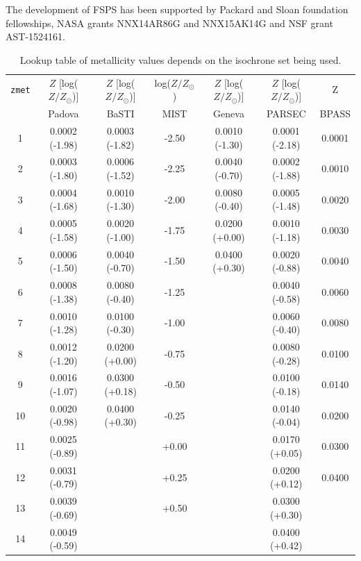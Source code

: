 \documentclass[]{article}
\begin{document}
The development of FSPS has been supported by Packard and Sloan foundation
fellowships, NASA grants NNX14AR86G and NNX15AK14G and NSF grant AST-1524161.


\clearpage

\begin{table}
\begin{center}
\caption{Lookup table of metallicity values depends on the
  isochrone set being used.}
\begin{tabular}{ccccccc}
\hline\hline
\texttt{zmet} & $Z$ [log($Z/Z_\odot$)] &  $Z$ [log($Z/Z_\odot$)] &
log($Z/Z_\odot$) & $Z$ [log($Z/Z_\odot$)] & $Z$ [log($Z/Z_\odot$)] & Z\\ &
Padova & BaSTI & MIST & Geneva & PARSEC & BPASS\\
\hline
1 &  0.0002  (-1.98) &  0.0003  (-1.82) & -2.50 & 0.0010 (-1.30) & 0.0001 (-2.18)& 0.0001\\
2 &  0.0003  (-1.80) &  0.0006  (-1.52) & -2.25 & 0.0040 (-0.70) & 0.0002 (-1.88)& 0.0010\\
3 &  0.0004  (-1.68) &  0.0010  (-1.30) & -2.00 & 0.0080 (-0.40) & 0.0005 (-1.48)& 0.0020\\
4 &  0.0005  (-1.58) &  0.0020  (-1.00) & -1.75 & 0.0200 (+0.00) & 0.0010 (-1.18)& 0.0030\\
5 &  0.0006  (-1.50) &  0.0040  (-0.70) & -1.50 & 0.0400 (+0.30) & 0.0020 (-0.88)& 0.0040\\
6 &  0.0008  (-1.38) &  0.0080  (-0.40) & -1.25 &                & 0.0040 (-0.58)& 0.0060\\
7 &  0.0010  (-1.28) &  0.0100  (-0.30) & -1.00 &                & 0.0060 (-0.40)& 0.0080\\
8 &  0.0012  (-1.20) &  0.0200  (+0.00) & -0.75 &                & 0.0080 (-0.28)& 0.0100\\
9 &  0.0016  (-1.07) &  0.0300  (+0.18) & -0.50 &                & 0.0100 (-0.18)& 0.0140\\
10 & 0.0020  (-0.98) &  0.0400  (+0.30) & -0.25 &                & 0.0140 (-0.04)& 0.0200\\
11 & 0.0025  (-0.89) &                  & +0.00 &                & 0.0170 (+0.05)& 0.0300\\
12 & 0.0031  (-0.79) &                  & +0.25 &                & 0.0200 (+0.12)& 0.0400\\
13 & 0.0039  (-0.69) &                  & +0.50 &                & 0.0300 (+0.30)& \\
14 & 0.0049  (-0.59) &  & & & 0.0400 (+0.42) &\\

\end{tabular}
\end{center}
\end{table}
\end{document}
